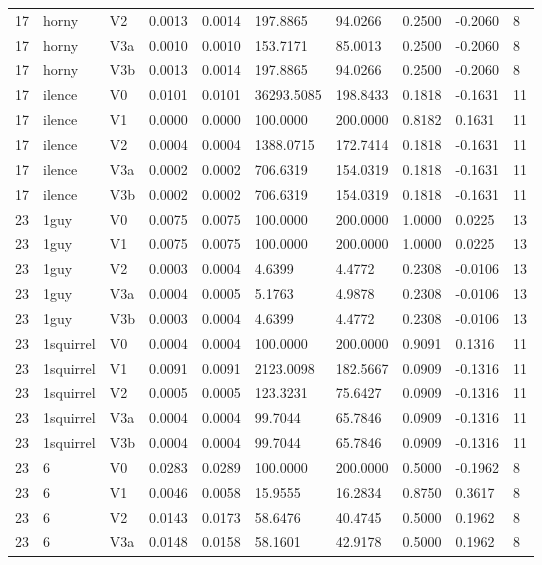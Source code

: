 \begin{table}[htbp]
\begin{tabular}{llllllllll}
17 & horny & V2 & 0.0013 & 0.0014 & 197.8865 & 94.0266 & 0.2500 & -0.2060 & 8 \\
17 & horny & V3a & 0.0010 & 0.0010 & 153.7171 & 85.0013 & 0.2500 & -0.2060 & 8 \\
17 & horny & V3b & 0.0013 & 0.0014 & 197.8865 & 94.0266 & 0.2500 & -0.2060 & 8 \\
17 & ilence & V0 & 0.0101 & 0.0101 & 36293.5085 & 198.8433 & 0.1818 & -0.1631 & 11 \\
17 & ilence & V1 & 0.0000 & 0.0000 & 100.0000 & 200.0000 & 0.8182 & 0.1631 & 11 \\
17 & ilence & V2 & 0.0004 & 0.0004 & 1388.0715 & 172.7414 & 0.1818 & -0.1631 & 11 \\
17 & ilence & V3a & 0.0002 & 0.0002 & 706.6319 & 154.0319 & 0.1818 & -0.1631 & 11 \\
17 & ilence & V3b & 0.0002 & 0.0002 & 706.6319 & 154.0319 & 0.1818 & -0.1631 & 11 \\
23 & 1guy & V0 & 0.0075 & 0.0075 & 100.0000 & 200.0000 & 1.0000 & 0.0225 & 13 \\
23 & 1guy & V1 & 0.0075 & 0.0075 & 100.0000 & 200.0000 & 1.0000 & 0.0225 & 13 \\
23 & 1guy & V2 & 0.0003 & 0.0004 & 4.6399 & 4.4772 & 0.2308 & -0.0106 & 13 \\
23 & 1guy & V3a & 0.0004 & 0.0005 & 5.1763 & 4.9878 & 0.2308 & -0.0106 & 13 \\
23 & 1guy & V3b & 0.0003 & 0.0004 & 4.6399 & 4.4772 & 0.2308 & -0.0106 & 13 \\
23 & 1squirrel & V0 & 0.0004 & 0.0004 & 100.0000 & 200.0000 & 0.9091 & 0.1316 & 11 \\
23 & 1squirrel & V1 & 0.0091 & 0.0091 & 2123.0098 & 182.5667 & 0.0909 & -0.1316 & 11 \\
23 & 1squirrel & V2 & 0.0005 & 0.0005 & 123.3231 & 75.6427 & 0.0909 & -0.1316 & 11 \\
23 & 1squirrel & V3a & 0.0004 & 0.0004 & 99.7044 & 65.7846 & 0.0909 & -0.1316 & 11 \\
23 & 1squirrel & V3b & 0.0004 & 0.0004 & 99.7044 & 65.7846 & 0.0909 & -0.1316 & 11 \\
23 & 6 & V0 & 0.0283 & 0.0289 & 100.0000 & 200.0000 & 0.5000 & -0.1962 & 8 \\
23 & 6 & V1 & 0.0046 & 0.0058 & 15.9555 & 16.2834 & 0.8750 & 0.3617 & 8 \\
23 & 6 & V2 & 0.0143 & 0.0173 & 58.6476 & 40.4745 & 0.5000 & 0.1962 & 8 \\
23 & 6 & V3a & 0.0148 & 0.0158 & 58.1601 & 42.9178 & 0.5000 & 0.1962 & 8 \\

\end{tabular}
\end{table}
